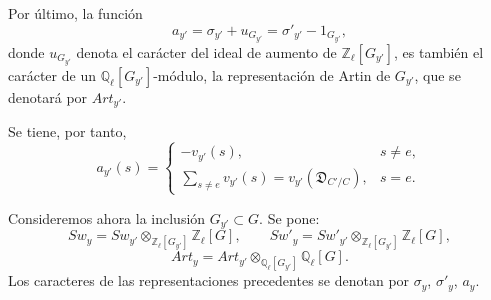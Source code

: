 Por último, la función
\[
a_{y'}=\sigma_{y'}+u_{G_{y'}}=\sigma'_{y'}-1_{G_{y'}},
\tag{4.2.5}
\]
donde $u_{G_{y'}}$ denota el carácter del ideal de aumento de $\mathbb Z_\ell[G_{y'}]$, es también el carácter de un $\mathbb Q_\ell[G_{y'}]$-módulo, la representación de Artin de $G_{y'}$, que se denotará por $Art_{y'}$.

Se tiene, por tanto,
\[
a_{y'}(s)=
\begin{cases}
-v_{y'}(s),& s\ne e,\\[0.4em]
\displaystyle\sum_{s\ne e}v_{y'}(s)=v_{y'}(\mathfrak D_{C'/C}),& s=e.
\end{cases}
\tag{4.2.6}
\]

Consideremos ahora la inclusión $G_{y'}\subset G$. Se pone:
\[
Sw_y=Sw_{y'}\otimes_{\mathbb Z_\ell[G_{y'}]}\mathbb Z_\ell[G],
\qquad
Sw'_y=Sw'_{y'}\otimes_{\mathbb Z_\ell[G_{y'}]}\mathbb Z_\ell[G],
\tag{4.2.7}
\]
\[
Art_y=Art_{y'}\otimes_{\mathbb Q_\ell[G_{y'}]}\mathbb Q_\ell[G].
\tag{4.2.8}
\]
Los caracteres de las representaciones precedentes se denotan por $\sigma_y$, $\sigma'_y$, $a_y$.
